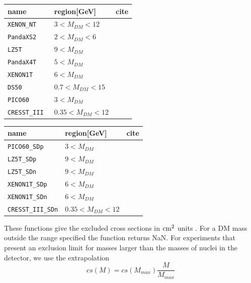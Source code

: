 \documentclass[12pt,a4paper]{article}
\begin{document}
\noindent
\begin{tabular}{|l| l|l|}
\hline
[{\color{blue}SI}]  name  &   region[GeV] & cite\\ 
\hline
 \verb|XENON_NT|       &   $ 3 < M_{DM}<12 $ & \cite{XENON:2024hup}    \\
 \verb|PandaXS2|       &   $ 2 < M_{DM}<6 $  & \cite{PandaX:2025rrz}    \\
 \verb|LZ5T|           &   $ 9 < M_{DM}$     &  \cite{Aalbers_2025} \\
 \verb|PandaX4T|       &   $ 5 < M_{DM}$     & \cite{PandaX-4T:2021bab} \\
 \verb|XENON1T|        &   $ 6 <  M_{DM}$   &\cite{Aprile:2018dbl}  \\
 \verb|DS50   |        &   $ 0.7 < M_{DM} < 15$    &\cite{Agnes:2018ves}   \\
 \verb|PICO60 |        &   $ 3 < M_{DM} $   & \cite{Amole:2019fdf}   \\
 \verb|CRESST_III |    &   $ 0.35 < M_{DM} < 12$   & \cite{Abdelhameed:2019hmk} \\
\hline 
\end{tabular}
%
\begin{tabular}{|l| l|l|}
\hline
[{\color{blue}SD}]  name  &   region[GeV] & cite\\ 
\hline
 \verb|PICO60_SDp|    &  $ 3 < M_{DM} $  & \cite{Amole:2019fdf} \\
 \verb|LZ5T_SDp|      &  $9 < M_{DM} $   & \cite{Aalbers_2025} \\
 \verb|LZ5T_SDn|      &   $9 < M_{DM} $  & \cite{Aalbers_2025} \\
 \verb|XENON1T_SDp|   &   $ 6 <  M_{DM} $ & \cite{Aprile:2019dbj} \\
 \verb|XENON1T_SDn|   &   $ 6 <  M_{DM}$ & \cite{Aprile:2019dbj} \\
 \verb|CRESST_III_SDn|& $ 0.35 < M_{DM} < 12$   & \cite{Abdelhameed:2019hmk}\\
\hline
\end{tabular}


These functions give the  excluded cross sections in ${\rm cm}^2$ units . For a DM mass outside the range specified the function returns
NaN. For experiments that present  an  exclusion limit for masses larger than the masses of nuclei in  the detector, we use the   extrapolation 
\begin{equation}
\nonumber
  cs(M) = cs(M_{max})\frac{M}{M_{max}}
\end{equation}
\end{document}
